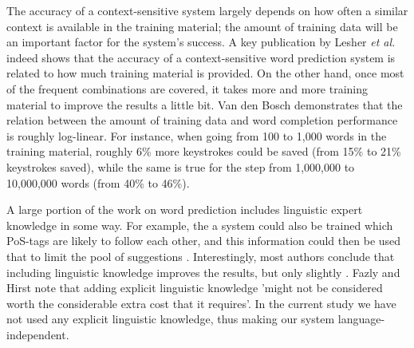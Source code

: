 \documentclass[12pt]{article}
\begin{document}
The accuracy of a context-sensitive system largely depends on how often a similar context is available in the training material; the amount of training data will be an important factor for the system's success. A key publication by Lesher {\em et al.} \citeyear{Lesher+99} indeed shows that the accuracy of a context-sensitive word prediction system is related to how much training material is provided. On the other hand, once most of the frequent combinations are covered, it takes more and more training material to improve the results a little bit. Van den Bosch \citeyear{vandenbosch11} demonstrates that the relation between the amount of training data and word completion performance is roughly log-linear. For instance, when going from 100 to 1,000 words in the training material, roughly 6\% more keystrokes could be saved (from 15\% to 21\% keystrokes saved), while the same is true for the step from 1,000,000 to 10,000,000 words (from 40\% to 46\%).

A large portion of the work on word prediction includes linguistic expert knowledge in some way. For example, the a system could also be trained which PoS-tags are likely to follow each other, and this information could then be used that to limit the pool of suggestions \cite{carlberger+97,Fazly+03,copestake97,Matiasek+02,garay-vitoria+97}. Interestingly, most authors conclude that including linguistic knowledge improves the results, but only slightly \cite{garay-vitoria+97,Fazly+03}. Fazly and Hirst \citeyear{Fazly+03} note that adding explicit linguistic knowledge 'might not be considered worth the considerable extra cost that it requires'. In the current study we have not used any explicit linguistic knowledge, thus making our system language-independent.

\end{document}
